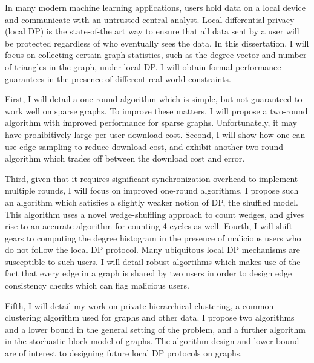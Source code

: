 \documentclass[12pt]{ucsddissertation}
\begin{document}
\begin{dissertationabstract}
In many modern machine learning applications, users hold data on a local device 
and communicate with an untrusted central analyst. Local differential privacy 
(local DP) is the state-of-the art way to ensure that all data sent by a user 
will be protected regardless of who eventually sees the data. In this dissertation,
I will focus on collecting certain graph statistics, such as the degree vector 
and number of triangles in the graph, under local DP. I will 
obtain formal performance guarantees in the presence of different real-world constraints.

First, I will detail a one-round algorithm which is simple, but not guaranteed to work 
well on sparse graphs. To improve these matters,
I will propose a two-round algorithm with improved performance 
for sparse graphs. Unfortunately, it may have prohibitively large per-user 
download cost. Second, I will show how one can use 
edge sampling to reduce download cost, and exhibit another two-round algorithm which
trades off between the download cost and error.

Third, given that it requires significant synchronization overhead to implement multiple rounds, I will 
focus on improved one-round algorithms. I propose such an algorithm which satisfies a slightly weaker
notion of DP, the shuffled model. This algorithm uses a novel wedge-shuffling approach
to count wedges, and gives rise to an accurate algorithm for counting 
4-cycles as well. Fourth, I will shift gears to computing the degree histogram in the presence
of malicious users who do not follow the local DP protocol. Many ubiquitous local DP mechanisms are susceptible to such users.
 I will detail robust algortihms which
makes use of the fact that every edge in a graph is shared by two users in order to design 
edge consistency checks which can flag malicious users.

Fifth, I will detail my work on private hierarchical clustering,
a common clustering algorithm used for graphs and other data. I propose two algorithms and 
a lower bound in the general setting of the problem, and a further algorithm in the stochastic 
block model of graphs. The algorithm design and lower bound 
are of interest to designing future local DP protocols on graphs.

\end{dissertationabstract}

\mainmatter
\end{document}
